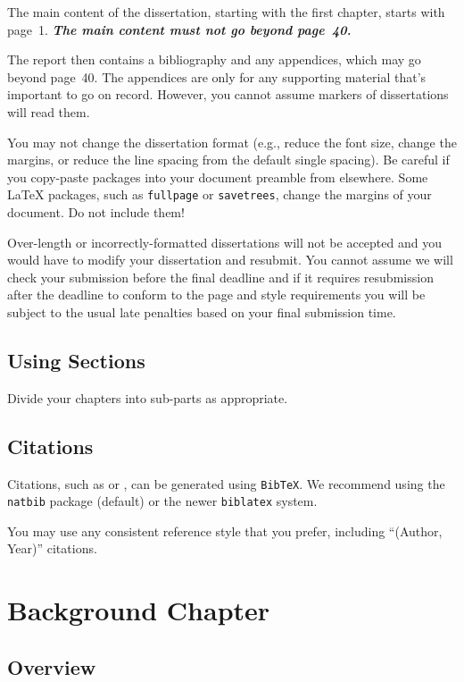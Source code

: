 \documentclass[logo,bsc,singlespacing,parskip]{infthesis}
\begin{document}
The main content of the dissertation, starting with the first chapter,
starts with page~1. \emph{\textbf{The main content must not go beyond page~40.}}

The report then contains a bibliography and any appendices, which may go beyond
page~40. The appendices are only for any supporting material that's important to
go on record. However, you cannot assume markers of dissertations will read them.

You may not change the dissertation format (e.g., reduce the font size, change
the margins, or reduce the line spacing from the default single spacing). Be
careful if you copy-paste packages into your document preamble from elsewhere.
Some \LaTeX{} packages, such as \texttt{fullpage} or \texttt{savetrees}, change
the margins of your document. Do not include them!

Over-length or incorrectly-formatted dissertations will not be accepted and you
would have to modify your dissertation and resubmit. You cannot assume we will
check your submission before the final deadline and if it requires resubmission
after the deadline to conform to the page and style requirements you will be
subject to the usual late penalties based on your final submission time.

\section{Using Sections}

Divide your chapters into sub-parts as appropriate.

\section{Citations}

Citations, such as \citet{P1} or \citep{P2}, can be generated using
\texttt{BibTeX}. We recommend using the \texttt{natbib} package (default) or the newer \texttt{biblatex} system. 

You may use any consistent reference style that you prefer, including ``(Author, Year)'' citations. 

\chapter{Background Chapter}

\section{Overview}
\end{document}

